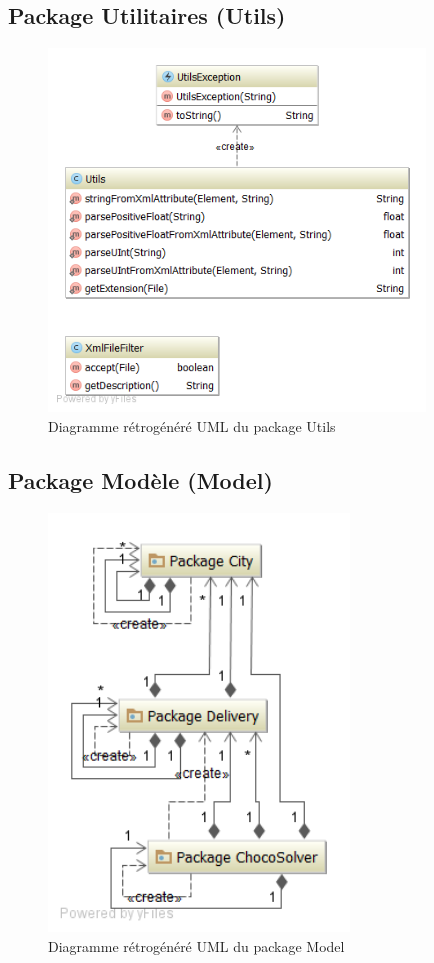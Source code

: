 \subsection{Package Utilitaires (Utils)}

\begin{figure}[h]
    \centering
    \includegraphics[width=100mm]{../diagrams/classes_packages/final_classes_packages/utils/package_utils.png}
    \caption{Diagramme r\'etrog\'en\'er\'e UML du package Utils}
    \label{diagram:gen_uml_utils}
\end{figure}
\pagebreak

\subsection{Package Mod\`ele (Model)}

\begin{figure}[h]
    \centering
    \includegraphics[width=80mm]{../diagrams/classes_packages/final_classes_packages/model/package_model.png}
    \caption{Diagramme r\'etrog\'en\'er\'e UML du package Model}
    \label{diagram:gen_uml_model}
\end{figure}
\pagebreak

